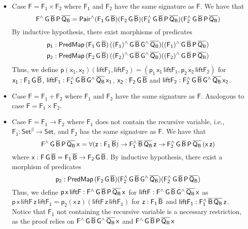 \documentclass[9pt]{entcs}
\begin{document}
\begin{itemize}
\item Case $\mathsf{F = F_1 \times F_2}$ where $\mathsf{F_1}$ and $\mathsf{F_2}$ have the same signature as $\mathsf{F}$.
We have that
\[
\mathsf{F^{\wedge}\,G\,\overline{B}\,P\,\overline{Q_B}
= Pair^{\wedge}(F_1\,G\,\overline{B})(F_2\,G\,\overline{B})(F_1^{\wedge}\,G\,\overline{B}\,P\,\overline{Q_B}) (F_2^{\wedge}\,G\,\overline{B}\,P\,\overline{Q_B})}
\]
By inductive hypothesis, there exist morphisms of predicates
\begin{gather*}
\mathsf{p_1 : PredMap\,(F_1\,G\,\overline{B})\,((F_1)^{\wedge}\,G\,\overline{B}\,G^{\wedge}\,\overline{Q_B}) ((F_1)^{\wedge}\,G\,\overline{B}\,P\,\overline{Q_B})} \\
\mathsf{p_2 : PredMap\,(F_2\,G\,\overline{B})\,((F_2)^{\wedge}\,G\,\overline{B}\,G^{\wedge}\,\overline{Q_B}) ((F_2)^{\wedge}\,G\,\overline{B}\,P\,\overline{Q_B})}
\end{gather*}
Thus, we define $\mathsf{p (x_1, x_2) (liftF_1, liftF_2) = (p_1\,x_1\,liftF_1, p_2\,x_2\,liftF_2)}$ 
for 
$\mathsf{x_1 : F_1\,G\,\overline{B}}$,
$\mathsf{liftF_1 : F_1^{\wedge}\,G\,\overline{B}\,G^{\wedge}\,\overline{Q_B}\,x_1}$,
$\mathsf{x_2 : F_2\,G\,\overline{B}}$
and $\mathsf{liftF_2 : F_2^{\wedge}\,G\,\overline{B}\,G^{\wedge}\,\overline{Q_B}\,x_2}$.
\item Case $\mathsf{F = F_1 + F_2}$ where $\mathsf{F_1}$ and $\mathsf{F_2}$ have the same signature as $\mathsf{F}$.
Analogous to case $\mathsf{F = F_1 \times F_2}$.
\item Case $\mathsf{F = F_1 \to F_2}$
where $\mathsf{F_1}$ does not contain the recursive variable,
i.e., $\mathsf{F_1 : Set^\beta \to Set}$,
and $\mathsf{F_2}$ has the same signature as $\mathsf{F}$.
We have that
\[
\mathsf{F^{\wedge}\,G\,\overline{B}\,P\,\overline{Q_B}\,x = \forall (z : F_1\,\overline{B}) \to F_1^{\wedge}\,\overline{B}\,\overline{Q_B}\,z \to F_2^{\wedge}\,G\,\overline{B}\,P\,\overline{Q_B}\,(x\,z)}
\]
where $\mathsf{x : F\,G\,\overline{B} = F_1\,\overline{B} \to F_2\,G\,\overline{B}}$.
By inductive hypothesis, there exist a morphism of predicates
\[
\mathsf{p_2 : PredMap\,(F_2\,G\,\overline{B}) (F_2^{\wedge}\,G\,\overline{B}\,G^{\wedge}\,\overline{Q_B}) (F_2^{\wedge}\,G\,\overline{B}\,P\,\overline{Q_B})}
\]
Thus, we define $\mathsf{p\,x\,liftF : F^{\wedge}\,G\,\overline{B}\,P\,\overline{Q_B}\,x}$
for $\mathsf{liftF : F^{\wedge}\,G\,\overline{B}\,G^{\wedge}\,\overline{Q_B}\,x}$
as $\mathsf{p\,x\,liftF\,z\,liftF_1 = p_2 (x\,z) (liftF\,z\,liftF_1)}$
for $\mathsf{z : F_1\,\overline{B}}$
and $\mathsf{liftF_1 : F_1^{\wedge}\,\overline{B}\,\overline{Q_B}\,z}$.
Notice that $\mathsf{F_1}$ not containing the recursive variable
is a necessary restriction, as the proof relies on
$\mathsf{F^{\wedge}\,G\,\overline{B}\,G^{\wedge}\,\overline{Q_B}\,x}$
and $\mathsf{F^{\wedge}\,G\,\overline{B}\,P\,\overline{Q_B}\,x}$

\end{itemize}
\end{document}
